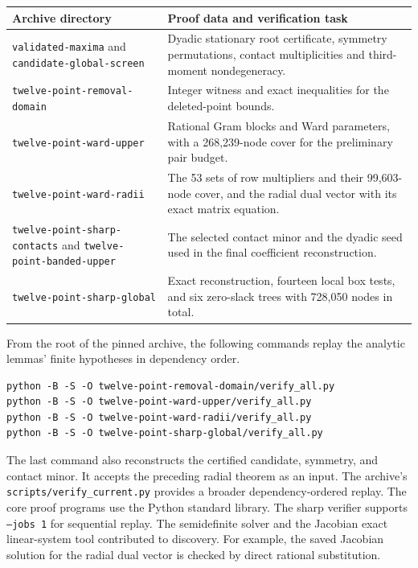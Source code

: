 \documentclass[11pt,letterpaper]{article}
\theoremstyle{remark}
\begin{document}
\begin{center}
\small
\begin{tabular}{@{}>{\raggedright\arraybackslash}p{.45\linewidth}
                     >{\raggedright\arraybackslash}p{.50\linewidth}@{}}
\toprule
Archive directory & Proof data and verification task\\
\midrule
\texttt{validated-maxima} and \texttt{candidate-global-screen}
 & Dyadic stationary root certificate, symmetry permutations, contact
 multiplicities and third-moment nondegeneracy.\\[3pt]
\texttt{twelve-point-removal-domain}
 & Integer witness and exact inequalities for the deleted-point bounds.\\[3pt]
\texttt{twelve-point-ward-upper}
 & Rational Gram blocks and Ward parameters, with a 268,239-node
 cover for the preliminary pair budget.\\[3pt]
\texttt{twelve-point-ward-radii}
 & The 53 sets of row multipliers and their 99,603-node cover, and
 the radial dual vector with its exact matrix equation.\\[3pt]
\texttt{twelve-point-sharp-contacts} and \texttt{twelve-point-banded-upper}
 & The selected contact minor and the dyadic seed used in the final
 coefficient reconstruction.\\[3pt]
\texttt{twelve-point-sharp-global}
 & Exact reconstruction, fourteen local box tests, and six
 zero-slack trees with 728,050 nodes in total.\\
\bottomrule
\end{tabular}
\end{center}

From the root of the pinned archive, the following commands replay the
analytic lemmas' finite hypotheses in dependency order.
\begin{verbatim}
python -B -S -O twelve-point-removal-domain/verify_all.py
python -B -S -O twelve-point-ward-upper/verify_all.py
python -B -S -O twelve-point-ward-radii/verify_all.py
python -B -S -O twelve-point-sharp-global/verify_all.py
\end{verbatim}
The last command also reconstructs the certified candidate, symmetry, and
contact minor. It accepts the preceding radial theorem as an input.
The archive's \texttt{scripts/verify\_current.py} provides a broader
dependency-ordered replay. The core proof programs use the Python standard
library. The sharp verifier supports \texttt{--jobs 1} for sequential replay.
The semidefinite solver and the Jacobian exact linear-system tool
contributed to discovery. For example, the saved Jacobian solution for
the radial dual vector is checked by direct rational substitution.
\end{document}
